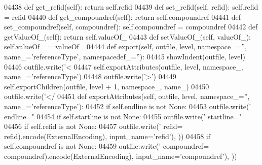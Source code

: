 \begin{DoxyCode}
{{{{{{{{{{{{{{{{{{{{{{{{{{{{{{{{{{{{{{{{{{{{{{{{{{{{{{{{{{{{{{{{{{{{{{{{{{{{{{{{{{{{{{{{{{{{{{{{{{{{{{{{{{{{{{{{{{{{{{{{{{{{{{{{{{{{{{{{{{{{{{{{{{{{{{{{{{{{{{{{{{{{{{{{{{{{{{{{{{{{{{{{{{{{{{{{{{{{{{{{{{{{{{{{{{{{{{{{{{{{{{{{{{{{{{{{{{{{{{{{{{{{{{{{{{{{{{{{{{{{{{{{{{{{{{{{{{{{{{{{{{{{{{{04438     \textcolor{keyword}{def }get_refid(self): \textcolor{keywordflow}{return} self.refid
04439     \textcolor{keyword}{def }set_refid(self, refid): self.refid = refid
04440     \textcolor{keyword}{def }get_compoundref(self): \textcolor{keywordflow}{return} self.compoundref
04441     \textcolor{keyword}{def }set_compoundref(self, compoundref): self.compoundref = compoundref
04442     \textcolor{keyword}{def }getValueOf_(self): \textcolor{keywordflow}{return} self.valueOf\_
04443     \textcolor{keyword}{def }setValueOf_(self, valueOf\_): self.valueOf\_ = valueOf\_
04444     \textcolor{keyword}{def }export(self, outfile, level, namespace\_='', name\_='referenceType', namespacedef\_=''):
04445         showIndent(outfile, level)
04446         outfile.write(\textcolor{stringliteral}{'<%
04447         self.exportAttributes(outfile, level, namespace\_, name\_=\textcolor{stringliteral}{'referenceType'})
04448         outfile.write(\textcolor{stringliteral}{'>'})
04449         self.exportChildren(outfile, level + 1, namespace\_, name\_)
04450         outfile.write(\textcolor{stringliteral}{'</%
04451     \textcolor{keyword}{def }exportAttributes(self, outfile, level, namespace\_='', name\_='referenceType'):
04452         \textcolor{keywordflow}{if} self.endline \textcolor{keywordflow}{is} \textcolor{keywordflow}{not} \textcolor{keywordtype}{None}:
04453             outfile.write(\textcolor{stringliteral}{' endline="%
04454         \textcolor{keywordflow}{if} self.startline \textcolor{keywordflow}{is} \textcolor{keywordflow}{not} \textcolor{keywordtype}{None}:
04455             outfile.write(\textcolor{stringliteral}{' startline="%
04456         \textcolor{keywordflow}{if} self.refid \textcolor{keywordflow}{is} \textcolor{keywordflow}{not} \textcolor{keywordtype}{None}:
04457             outfile.write(\textcolor{stringliteral}{' refid=%
      refid).encode(ExternalEncoding), input\_name=\textcolor{stringliteral}{'refid'}), ))
04458         \textcolor{keywordflow}{if} self.compoundref \textcolor{keywordflow}{is} \textcolor{keywordflow}{not} \textcolor{keywordtype}{None}:
04459             outfile.write(\textcolor{stringliteral}{' compoundref=%
      compoundref).encode(ExternalEncoding), input\_name=\textcolor{stringliteral}{'compoundref'}), ))
}}}}}}}}}}}}}}}}}}}}}}}}}}}}}}}}}}}}}}}}}}}}}}}}}}}}}}}}}}}}}}}}}}}}}}}}}}}}}}}}}}}}}}}}}}}}}}}}}}}}}}}}}}}}}}}}}}}}}}}}}}}}}}}}}}}}}}}}}}}}}}}}}}}}}}}}}}}}}}}}}}}}}}}}}}}}}}}}}}}}}}}}}}}}}}}}}}}}}}}}}}}}}}}}}}}}}}}}}}}}}}}}}}}}}}}}}}}}}}}}}}}}}}}}}}}}}}}}}}}}}}}}}}}}}}}}}}}}}}}}}}}}}}}}}}}}}
\end{DoxyCode}

